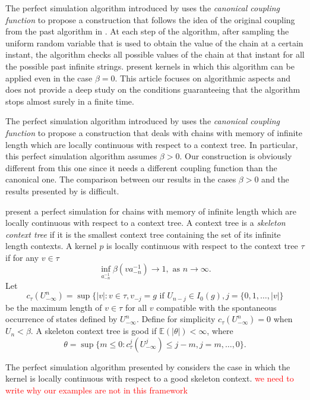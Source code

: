 \documentclass[a4paper]{article}
\newcommand{\E}{\mathbb{E}}
\begin{document}
The perfect simulation algorithm introduced by \cite{ciftp} uses the \textit{canonical coupling function} to propose a construction that follows the idea of the original coupling from the past algorithm in \cite{cftp}. At each step of the algorithm, after sampling the uniform random variable that is used to obtain the value of the chain at a certain instant, the algorithm checks all possible values of the chain at that instant for all the possible past infinite strings. \cite{ciftp} present kernels in which this algorithm can be applied even in the case $\beta=0$. This article focuses on algorithmic aspects and does not provide a deep study on the conditions guaranteeing that the algorithm stops almost surely in a finite time.


The perfect simulation algorithm introduced by \cite{gallogarcia} uses the \textit{canonical coupling function} to propose a construction that deals with chains with memory of infinite length which are locally continuous with respect to a context tree. In particular, this perfect simulation algorithm assumes $\beta>0$. Our construction is obviously different from this one since it needs a different coupling function than the canonical one. The comparison between our results in the cases $\beta>0$ and the results presented by \cite{gallogarcia} is difficult.


\iffalse
\cite{gallogarcia} present a perfect simulation for chains with memory of infinite length which are locally continuous with respect to a context tree. A context tree is a {\it skeleton context tree} if it is the smallest context tree containing the set of its infinite length contexts. A kernel $p$ is locally continuous with respect to the context tree $\tau$ if for any $v\in \tau$
$$
\inf_{a_{-n}^{-1}}\beta(va_{-n}^{-1})\to 1, \text{ as } n \to \infty.
$$
Let 
$$
c_{\tau}(U_{-\infty}^{n})=\sup\{|v|:v\in \tau, v_{-j}=g \text{ if } U_{n-j}\in I_0(g), j=\{0,1,\ldots,|v|\}
$$ 
be the maximum length of $v\in \tau$ for all $v$ compatible with the spontaneous occurrence of states defined by $U_{-\infty}^{n}$. Define for simplicity $c_{\tau}(U_{-\infty}^{n})=0$ when $U_n<\beta$. A skeleton context tree is good if $\E(|\theta|)<\infty$, where
$$
\theta=\sup\{m\leq 0: c_{\tau}^j(U_{-\infty}^{j}) \leq j-m, j=m,\ldots, 0\}.
$$

The perfect simulation algorithm presented by \cite{gallogarcia} considers the case in which the kernel is locally continuous with respect to a good skeleton context. \textcolor{red}{we need to write why our examples are not in this framework}
\end{document}
